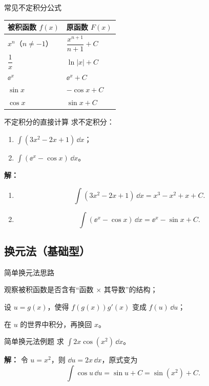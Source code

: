 \documentclass[a4paper,11pt]{ctexart}
\begin{document}
\begin{summarybox}{常见不定积分公式}
\begin{center}
\begin{tabular}{ll}
\toprule
被积函数 $f(x)$ & 原函数 $F(x)$ \\
\midrule
$x^n$（$n\ne -1$） & $\dfrac{x^{n+1}}{n+1}+C$ \\
$\dfrac{1}{x}$ & $\ln|x|+C$ \\
$\ee^x$ & $\ee^x+C$ \\
$\sin x$ & $-\cos x+C$ \\
$\cos x$ & $\sin x+C$ \\
\bottomrule
\end{tabular}
\end{center}
\end{summarybox}

\begin{examplebox}{不定积分的直接计算}
求不定积分：
\begin{enumerate}
  \item $\displaystyle\int(3x^2-2x+1)\,\dd x$；
  \item $\displaystyle\int(\ee^x-\cos x)\,\dd x$。
\end{enumerate}
\textbf{解：}
\begin{enumerate}
  \item
  \[
    \int(3x^2-2x+1)\,\dd x
    =x^3-x^2+x+C.
  \]
  \item
  \[
    \int(\ee^x-\cos x)\,\dd x
    =\ee^x-\sin x+C.
  \]
\end{enumerate}
\end{examplebox}

\subsection{换元法（基础型）}

\begin{notebox}{简单换元法思路}
\begin{focuspoints}
  \item 观察被积函数是否含有“函数 $\times$ 其导数”的结构；
  \item 设 $u=g(x)$，使得 $f(g(x))g'(x)$ 变成 $f(u)\,\dd u$；
  \item 在 $u$ 的世界中积分，再换回 $x$。
\end{focuspoints}
\end{notebox}

\begin{examplebox}{简单换元法例题}
求 $\displaystyle\int 2x\cos(x^2)\,\dd x$。

\textbf{解：}
令 $u=x^2$，则 $\dd u=2x\,\dd x$，原式变为
\[
  \int \cos u\,\dd u=\sin u+C=\sin(x^2)+C.
\]
\end{examplebox}
\end{document}
